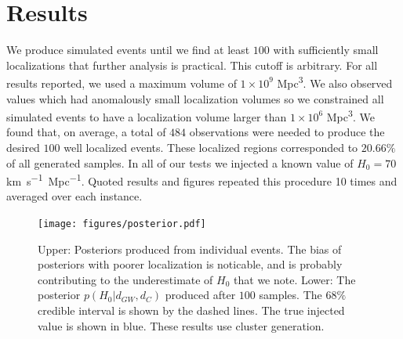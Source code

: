 \section{Results} \label{sec:conclusions}
We produce simulated events until we find at least $100$ with sufficiently small localizations that further analysis is practical.
This cutoff is arbitrary. For all results reported, we used a maximum volume of $1\times 10^{9}$ \si{Mpc^3}.
We also observed values which had anomalously small localization volumes so we constrained all simulated events to have a localization volume larger than $1\times 10^{6}$ \si{Mpc^3}.
We found that, on average, a total of $484$ observations were needed to produce the desired $100$ well localized events.
These localized regions corresponded to $20.66\%$ of all generated samples.
In all of our tests we injected a known value of $H_0=70$ \si{km.s^{-1}.Mpc^{-1}}.
Quoted results and figures repeated this procedure 10 times and averaged over each instance.


\begin{figure}[t]
    \centering
    \texttt{[image: figures/posterior.pdf]}
    \caption{Upper: Posteriors produced from individual events. The bias of posteriors with poorer localization is noticable, and is probably contributing to the underestimate of $H_0$ that we note. Lower: The posterior $p(H_0 | d_{GW}, d_C)$ produced after $100$ samples. The $68\%$ credible interval is shown by the dashed lines. The true injected value is shown in blue. These results use cluster generation.}
    \label{fig:posterior}
\end{figure}

